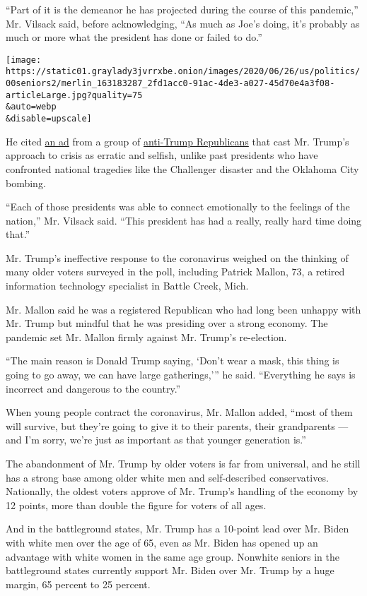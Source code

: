 ``Part of it is the demeanor he has projected during the course of this
pandemic,'' Mr. Vilsack said, before acknowledging, ``As much as Joe's
doing, it's probably as much or more what the president has done or
failed to do.''

\texttt{[image: https://static01.graylady3jvrrxbe.onion/images/2020/06/26/us/politics/00seniors2/merlin\_163183287\_2fd1acc0-91ac-4de3-a027-45d70e4a3f08-articleLarge.jpg?quality=75\\\&auto=webp\\\&disable=upscale]}

He cited
\href{https://twitter.com/ProjectLincoln/status/1276112782187003904?s=20}{an
ad} from a group of
\href{https://www.nytimes3xbfgragh.onion/2019/12/17/opinion/lincoln-project.html}{anti-Trump
Republicans} that cast Mr. Trump's approach to crisis as erratic and
selfish, unlike past presidents who have confronted national tragedies
like the Challenger disaster and the Oklahoma City bombing.

``Each of those presidents was able to connect emotionally to the
feelings of the nation,'' Mr. Vilsack said. ``This president has had a
really, really hard time doing that.''

Mr. Trump's ineffective response to the coronavirus weighed on the
thinking of many older voters surveyed in the poll, including Patrick
Mallon, 73, a retired information technology specialist in Battle Creek,
Mich.

Mr. Mallon said he was a registered Republican who had long been unhappy
with Mr. Trump but mindful that he was presiding over a strong economy.
The pandemic set Mr. Mallon firmly against Mr. Trump's re-election.

``The main reason is Donald Trump saying, `Don't wear a mask, this thing
is going to go away, we can have large gatherings,''' he said.
``Everything he says is incorrect and dangerous to the country.''

When young people contract the coronavirus, Mr. Mallon added, ``most of
them will survive, but they're going to give it to their parents, their
grandparents --- and I'm sorry, we're just as important as that younger
generation is.''

The abandonment of Mr. Trump by older voters is far from universal, and
he still has a strong base among older white men and self-described
conservatives. Nationally, the oldest voters approve of Mr. Trump's
handling of the economy by 12 points, more than double the figure for
voters of all ages.

And in the battleground states, Mr. Trump has a 10-point lead over Mr.
Biden with white men over the age of 65, even as Mr. Biden has opened up
an advantage with white women in the same age group. Nonwhite seniors in
the battleground states currently support Mr. Biden over Mr. Trump by a
huge margin, 65 percent to 25 percent.

